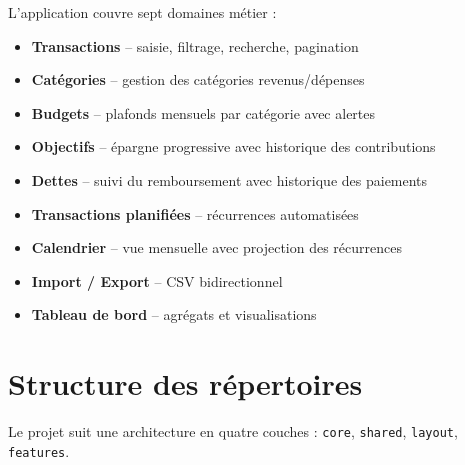 \documentclass[12pt,a4paper]{article}
\begin{document}
L'application couvre sept domaines métier :

\begin{itemize}[itemsep=2pt]
  \item \textbf{Transactions} -- saisie, filtrage, recherche, pagination
  \item \textbf{Catégories} -- gestion des catégories revenus/dépenses
  \item \textbf{Budgets} -- plafonds mensuels par catégorie avec alertes
  \item \textbf{Objectifs} -- épargne progressive avec historique des contributions
  \item \textbf{Dettes} -- suivi du remboursement avec historique des paiements
  \item \textbf{Transactions planifiées} -- récurrences automatisées
  \item \textbf{Calendrier} -- vue mensuelle avec projection des récurrences
  \item \textbf{Import / Export} -- CSV bidirectionnel
  \item \textbf{Tableau de bord} -- agrégats et visualisations
\end{itemize}

\section{Structure des répertoires}

Le projet suit une architecture en quatre couches :
\texttt{core}, \texttt{shared}, \texttt{layout}, \texttt{features}.
\end{document}

